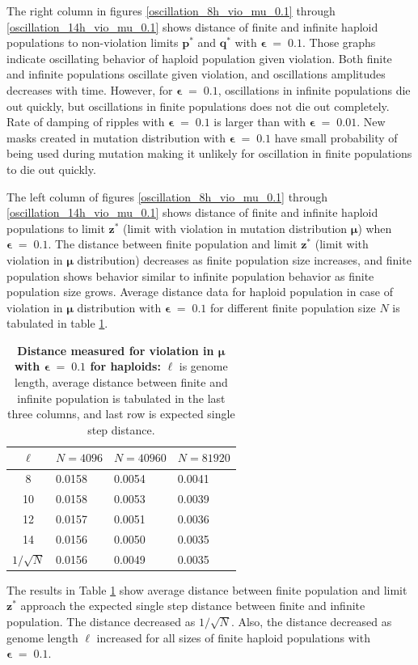 \clearpage

The right column in figures \ref{oscillation_8h_vio_mu_0.1} through \ref{oscillation_14h_vio_mu_0.1} 
shows distance of finite and infinite haploid populations to non-violation limits $\bm{p^\ast}$ and $\bm{q^\ast}$ with $\bm{\epsilon} \;=\; 0.1$. 
Those graphs indicate oscillating behavior of haploid population given violation. 
Both finite and infinite populations oscillate given violation, and oscillations amplitudes decreases with time. 
However, for $\bm{\epsilon} \;=\; 0.1$, oscillations in infinite populations die out quickly, 
but oscillations in finite populations does not die out completely. Rate of damping of ripples with $\bm{\epsilon} \;=\; 0.1$ is  
larger than with $\bm{\epsilon} \;=\; 0.01$. New masks created in mutation distribution with $\bm{\epsilon} \;=\; 0.1$ have small  
probability of being used during mutation making it unlikely for oscillation in finite populations to die out quickly.

The left column of figures \ref{oscillation_8h_vio_mu_0.1} through \ref{oscillation_14h_vio_mu_0.1} 
shows distance of finite and infinite haploid populations to limit $\bm{z^\ast}$ 
(limit with violation in mutation distribution $\bm{\mu}$) when $\bm{\epsilon} \;=\; 0.1$. 
The distance between finite population and limit $\bm{z}^\ast$ (limit with violation in $\bm{\mu}$ distribution) 
decreases as finite population size increases, 
and finite population shows behavior similar to infinite population behavior as finite population size grows. 
Average distance data for haploid population in case of violation in $\bm{\mu}$ distribution 
with $\bm{\epsilon} \;=\; 0.1$ for different finite population size $N$ is tabulated in table \ref{distanceMuHapEps0.1}.

\begin{table}[ht]
\caption{\textbf{Distance measured for violation in $\bm{\mu}$ with $\bm{\epsilon} \;=\; 0.1$ for haploids:} $\ell$ is genome length, 
average distance between finite and infinite population is tabulated in the last three columns, and last row is expected single step distance.}
\centering
\begin{tabularx}{0.75\textwidth}{ c *{3}{X}}
\toprule
$\ell$ & $N = 4096$ & $N = 40960$ & $N = 81920$ \\
\midrule
8 & 0.0158	& 0.0054 	& 0.0041 \\
10 & 0.0158	& 0.0053 	& 0.0039 \\	
12 & 0.0157	& 0.0051 	& 0.0036 \\	
14 & 0.0156	& 0.0050 	& 0.0035 \\
\midrule
$1/\sqrt{N}$ & 0.0156 & 0.0049 & 0.0035 \\
\bottomrule
\end{tabularx}
\label{distanceMuHapEps0.1}
\end{table}

The results in Table \ref{distanceMuHapEps0.1} show average distance 
between finite population and limit $\bm{z^\ast}$ approach the expected single step distance 
between finite and infinite population. The distance decreased as $1/\sqrt{N}$. 
Also, the distance decreased as genome length $\ell$ increased for all sizes of finite haploid populations 
with $\bm{\epsilon} \;=\; 0.1$.
